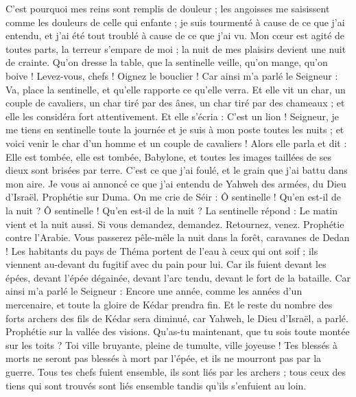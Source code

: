 \begin{multicols}{2}
C'est pourquoi mes reins sont remplis de douleur ; les angoisses me saisissent comme les douleurs de celle qui enfante ; je suis tourmenté à cause de ce que j'ai entendu, et j'ai été tout troublé à cause de ce que j'ai vu.
Mon cœur est agité de toutes parts, la terreur s'empare de moi ; la nuit de mes plaisirs devient une nuit de crainte.
Qu'on dresse la table, que la sentinelle veille, qu'on mange, qu'on boive ! Levez-vous, chefs ! Oignez le bouclier !
Car ainsi m'a parlé le Seigneur : Va, place la sentinelle, et qu'elle rapporte ce qu'elle verra.
Et elle vit un char, un couple de cavaliers, un char tiré par des ânes, un char tiré par des chameaux ; et elle les considéra fort attentivement.
Et elle s'écria : C'est un lion ! Seigneur, je me tiens en sentinelle toute la journée et je suis à mon poste toutes les nuits ;
et voici venir le char d'un homme et un couple de cavaliers ! Alors elle parla et dit : Elle est tombée, elle est tombée, Babylone, et toutes les images taillées de ses dieux sont brisées par terre.
C'est ce que j'ai foulé, et le grain que j'ai battu dans mon aire. Je vous ai annoncé ce que j'ai entendu de Yahweh des armées, du Dieu d'Israël.
Prophétie sur Duma. On me crie de Séir : Ô sentinelle ! Qu'en est-il de la nuit ? Ô sentinelle ! Qu'en est-il de la nuit ?
La sentinelle répond : Le matin vient et la nuit aussi. Si vous demandez, demandez. Retournez, venez.
Prophétie contre l'Arabie. Vous passerez pêle-mêle la nuit dans la forêt, caravanes de Dedan !
Les habitants du pays de Théma portent de l'eau à ceux qui ont soif ; ils viennent au-devant du fugitif avec du pain pour lui.
Car ils fuient devant les épées, devant l'épée dégainée, devant l'arc tendu, devant le fort de la bataille.
Car ainsi m'a parlé le Seigneur : Encore une année, comme les années d'un mercenaire, et toute la gloire de Kédar prendra fin.
Et le reste du nombre des forts archers des fils de Kédar sera diminué, car Yahweh, le Dieu d'Israël, a parlé.
\VerseOne{}Prophétie sur la vallée des visions. Qu'as-tu maintenant, que tu sois toute montée sur les toits ?
Toi ville bruyante, pleine de tumulte, ville joyeuse ! Tes blessés à morts ne seront pas blessés à mort par l'épée, et ils ne mourront pas par la guerre.
Tous tes chefs fuient ensemble, ils sont liés par les archers ; tous ceux des tiens qui sont trouvés sont liés ensemble tandis qu'ils s'enfuient au loin.

\end{multicols}
